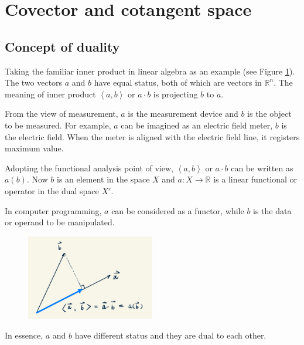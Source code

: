 \documentclass[11pt, a4paper]{book}
\begin{document}
\section{Covector and cotangent space}

\subsection{Concept of duality}
\label{sec:duality-concept}

Taking the familiar inner product in linear algebra as an example (see Figure
\ref{fig:inner-product-of-vectors}). The two vectors $a$ and $b$ have equal status, both
of which are vectors in $\mathbb{R}^n$. The meaning of inner product
$\left\langle a,b \right\rangle$ or $a\cdot b$ is projecting $b$ to $a$.

From the view of measurement, $a$ is the measurement device and $b$ is the object to be
measured. For example, $a$ can be imagined as an electric field meter, $b$ is the electric
field. When the meter is aligned with the electric field line, it registers maximum value.

Adopting the functional analysis point of view, $\left\langle a,b \right\rangle$ or
$a\cdot b$ can be written as $a(b)$. Now $b$ is an element in the space $X$ and
$a: X \rightarrow \mathbb{R}$ is a linear functional or operator in the dual space $X'$.

In computer programming, $a$ can be considered as a functor, while $b$ is the data or
operand to be manipulated.
\begin{figure}[htbp]
  \centering
  \includegraphics[width=0.5\textwidth, height=\textheight, keepaspectratio]{figures/inner-product-of-vectors-draft}
  \caption{}
  \label{fig:inner-product-of-vectors}
\end{figure}

In essence, $a$ and $b$ have different status and they are dual to each other.
\end{document}
